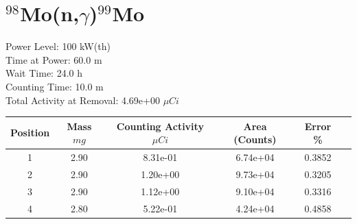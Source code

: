 \newpage

\section*{ $^{98}$Mo(n,$\gamma$)$^{99}$Mo }

Power Level: 100 kW(th) \\
Time at Power: 60.0 m \\
Wait Time: 24.0 h \\
Counting Time: 10.0 m \\
Total Activity at Removal: 4.69e+00 $\mu Ci$

\begin{table}[h]
\centering
\begin{tabular}{ |c|c|c|c|c|c| }
 \hline
 Position & Mass $mg$ & Counting Activity $\mu Ci$ & Area (Counts) & Error \% \\
 \hline 
 1 & 2.90 & 8.31e-01 & 6.74e+04 & 0.3852 \\ 
\hline
 2 & 2.90 & 1.20e+00 & 9.73e+04 & 0.3205 \\ 
\hline
 3 & 2.90 & 1.12e+00 & 9.10e+04 & 0.3316 \\ 
\hline
 4 & 2.80 & 5.22e-01 & 4.24e+04 & 0.4858 \\ 
\hline
\end{tabular}
\end{table}

